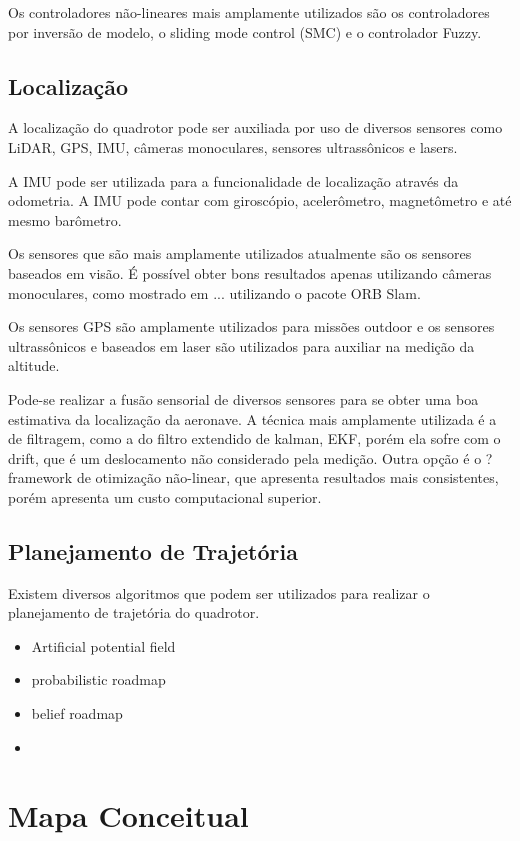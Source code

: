 Os controladores não-lineares mais amplamente utilizados são os controladores por inversão de modelo, o sliding mode control (SMC) e o controlador Fuzzy.

\subsection{Localização}
A localização do quadrotor pode ser auxiliada por uso de diversos sensores como LiDAR, GPS, IMU, câmeras monoculares, sensores ultrassônicos e lasers.

A IMU pode ser utilizada para a funcionalidade de localização através da odometria. A IMU pode contar com giroscópio, acelerômetro, magnetômetro e até mesmo barômetro.

Os sensores que são mais amplamente utilizados atualmente são os sensores baseados em visão. É possível obter bons resultados apenas utilizando câmeras monoculares, como mostrado em ... utilizando o pacote ORB Slam.

Os sensores GPS são amplamente utilizados para missões outdoor e os sensores ultrassônicos e baseados em laser são utilizados para auxiliar na medição da altitude.

Pode-se realizar a fusão sensorial de diversos sensores para se obter uma boa estimativa da localização da aeronave. A técnica mais amplamente utilizada é a de filtragem, como a do filtro extendido de kalman, EKF, porém ela sofre com o drift, que é um deslocamento não considerado pela medição. Outra opção é o ? framework de otimização não-linear, que apresenta resultados mais consistentes, porém apresenta um custo computacional superior.

\subsection{Planejamento de Trajetória}
Existem diversos algoritmos que podem ser utilizados para realizar o planejamento de trajetória do quadrotor.
\begin{itemize}
    \item Artificial potential field
    \item probabilistic roadmap
    \item belief roadmap
    \item 
\end{itemize}


\section{Mapa Conceitual}
